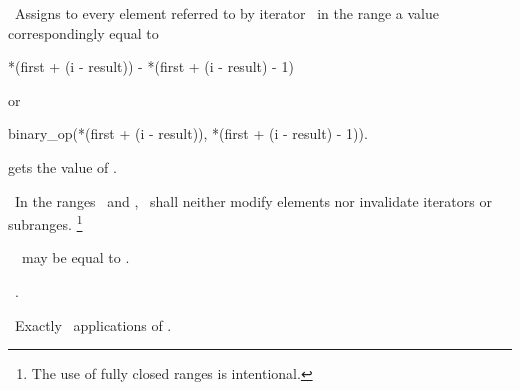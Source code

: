 \documentclass[american,twoside]{book}
\begin{document}
\begin{paras}
\begin{itemdescr}
\pnum
\effects\ 
Assigns to every element referred to by iterator
\
in the range
a value correspondingly equal to

\begin{codeblock}
*(first + (i - result)) - *(first + (i - result) - 1)
\end{codeblock}

or

\begin{codeblock}
binary_op(*(first + (i - result)), *(first + (i - result) - 1)).
\end{codeblock}

gets the value of
.

\pnum
\requires\ 
In the ranges
\
and
,
\
shall neither modify elements nor invalidate iterators or subranges.%
\footnote{The use of fully closed ranges is intentional.
}

\pnum
\notes\ 
\tcode{result}\
may be equal to
\tcode{first}.

\pnum
\returns\ 
.

\pnum
\complexity\ 
Exactly
\
applications of
.
\end{itemdescr}

\end{paras}



\end{document}
